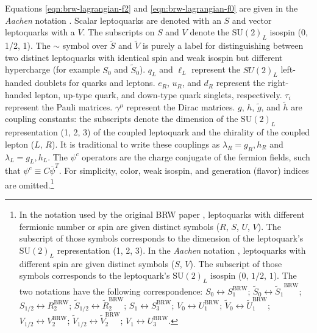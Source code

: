 Equations \ref{eqn:brw-lagrangian-f2} and \ref{eqn:brw-lagrangian-f0} are given in the {\it Aachen} notation 
\cite{mBRW-aachen}. Scalar leptoquarks are denoted with an $S$ and vector leptoquarks with a $V$.  
The subscripts on $S$ and $V$ denote 
the $\text{SU}(2)_{L}$ isospin (0, 1/2, 1).
The $\sim$ symbol over ${\tilde S}$ and ${\tilde V}$ is purely a label for distinguishing 
between two distinct leptoquarks with identical spin and weak isospin but different hypercharge
(for example $S_0$ and ${\tilde S}_{0}$).
$q_{L}$ and $\ell_{L}$ represent the $SU(2)_{L}$ left-handed doublets for quarks and leptons.
$e_{R}$, $u_{R}$, and $d_{R}$ represent the right-handed lepton, up-type quark, and down-type quark singlets, respectively.
$\tau_{i}$ represent the Pauli matrices. $\gamma^\mu$ represent the Dirac matrices.  
$g$, $h$, ${\tilde g}$, and ${\tilde h}$ are coupling constants: the subscripts denote 
the dimension of the $\text{SU}(2)_{L}$ representation (1, 2, 3) of the coupled leptoquark and
the chirality of the coupled lepton ($L$, $R$).  It is traditional to write these 
couplings as $\lambda_{R} = g_{R},h_{R}$ and $\lambda_{L} = g_{L},h_{L}$.
The $\psi^{c}$ operators are the charge conjugate of the fermion fields, such that $\psi^{c} \equiv C \overline{\psi}^{T}$.
For simplicity, color, weak isospin, and generation (flavor) indices are omitted.\footnote{
In the notation used by the original BRW paper \cite{mBRW1}, leptoquarks with different 
fermionic number or spin are given distinct symbols ($R$, $S$, $U$, $V$).  The subscript of those symbols corresponds
to the dimension of the leptoquark's $\text{SU}(2)_{L}$ representation (1, 2, 3).
In the {\it Aachen} notation \cite{mBRW-aachen}, leptoquarks with different spin are given 
distinct symbols ($S$, $V$).  The subscript of those symbols corresponds to the leptoquark's 
$\text{SU}(2)_{L}$ isospin ($0$, $1/2$, $1$).
The two notations have the following correspondence:
$S_{0}\leftrightarrow S_{1}^{\text{BRW}}$;
${\tilde S}_{0}\leftrightarrow {\tilde S_{1}}^{\text{BRW}}$;
$S_{1/2}\leftrightarrow R_{2}^{\text{BRW}}$;
${\tilde S}_{1/2}\leftrightarrow {\tilde R}_{2}^{\text{BRW}}$;
$S_{1}\leftrightarrow S_{3}^{\text{BRW}}$;
$V_{0}\leftrightarrow U_{1}^{\text{BRW}}$;
${\tilde V}_{0}\leftrightarrow {\tilde U}_{1}^{\text{BRW}}$;
$V_{1/2}\leftrightarrow V_{2}^{\text{BRW}}$;
${\tilde V}_{1/2}\leftrightarrow {\tilde V}_{2}^{\text{BRW}}$;
$V_{1}\leftrightarrow U_{3}^{\text{BRW}}$.}

